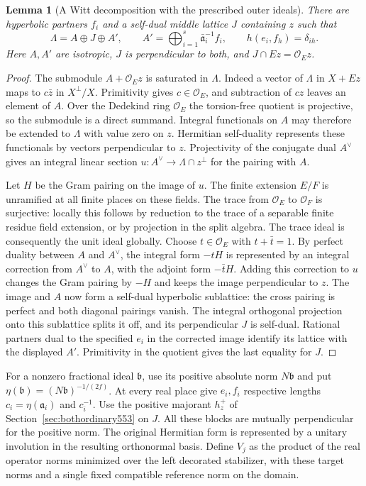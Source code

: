 \documentclass[a4paper,11pt]{article}
\newtheorem{lemma}[proposition]{Lemma}
\theoremstyle{definition}
\theoremstyle{remark}
\numberwithin{equation}{section}
\begin{document}
\begin{lemma}[A Witt decomposition with the prescribed outer ideals]
\leavevmode\label{lem:projectivewitt554}
There are hyperbolic partners \(f_i\) and a self-dual middle
lattice \(J\) containing \(z\) such that
\[
 \Lambda=A\oplus J\oplus A',\qquad
 A'=\bigoplus_{i=1}^{s}\bar{\mathfrak a}_i^{-1} f_i,\qquad
 h(e_i,f_h)=\delta_{ih}.
\]
Here \(A,A'\) are isotropic, \(J\) is perpendicular to both,
and \(J\cap Ez=\mathcal O_Ez\).
\end{lemma}
\begin{proof}
The submodule \(A+\mathcal O_E z\) is saturated in \(\Lambda\).
Indeed a vector of \(\Lambda\) in \(X+Ez\) maps to
\(c\bar z\) in \(X^\perp/X\). Primitivity gives \(c\in\mathcal O_E\),
and subtraction of \(cz\) leaves an element of \(A\).
Over the Dedekind ring \(\mathcal O_E\) the torsion-free quotient
is projective, so the submodule is a direct summand. Integral
functionals on \(A\) may therefore be extended to \(\Lambda\)
with value zero on \(z\). Hermitian self-duality represents
these functionals by vectors perpendicular to \(z\).
Projectivity of the conjugate dual \(A^\vee\) gives an integral
linear section \(u:A^\vee\to\Lambda\cap z^\perp\) for the
pairing with \(A\).

Let \(H\) be the Gram pairing on the image of \(u\). The finite
extension \(E/F\) is unramified at all finite places on these
fields. The trace from \(\mathcal O_E\) to \(\mathcal O_F\) is
surjective: locally this follows by reduction to the trace of a
separable finite residue field extension, or by projection in
the split algebra. The trace ideal is consequently the unit
ideal globally. Choose \(t\in\mathcal O_E\) with \(t+\bar t=1\).
By perfect duality between \(A\) and \(A^\vee\), the integral
form \(-tH\) is represented by an integral correction from
\(A^\vee\) to \(A\), with the adjoint form \(-\bar tH\).
Adding this correction to \(u\) changes the Gram pairing by
\(-H\) and keeps the image perpendicular to \(z\). The image
and \(A\) now form a self-dual hyperbolic sublattice:
the cross pairing is perfect and both diagonal pairings vanish.
The integral orthogonal projection onto this sublattice splits
it off, and its perpendicular \(J\) is self-dual. Rational
partners dual to the specified \(e_i\) in the corrected image
identify its lattice with the displayed \(A'\). Primitivity in
the quotient gives the last equality for \(J\).
\end{proof}

For a nonzero fractional ideal \(\mathfrak b\), use its positive
absolute norm \(N\mathfrak b\) and put
\(\eta(\mathfrak b)=(N\mathfrak b)^{-1/(2f)}\).
At every real place give \(e_i,f_i\) respective lengths
\(c_i=\eta(\mathfrak a_i)\) and \(c_i^{-1}\). Use the positive
majorant \(h_z^+\) of Section~\ref{sec:bothordinary553} on \(J\).
All these blocks are mutually perpendicular for the positive
norm. The original Hermitian form is represented by a unitary
involution in the resulting orthonormal basis. Define \(V_j\)
as the product of the real operator norms minimized over the
left decorated stabilizer, with these target norms and a single
fixed compatible reference norm on the domain.
\end{document}
